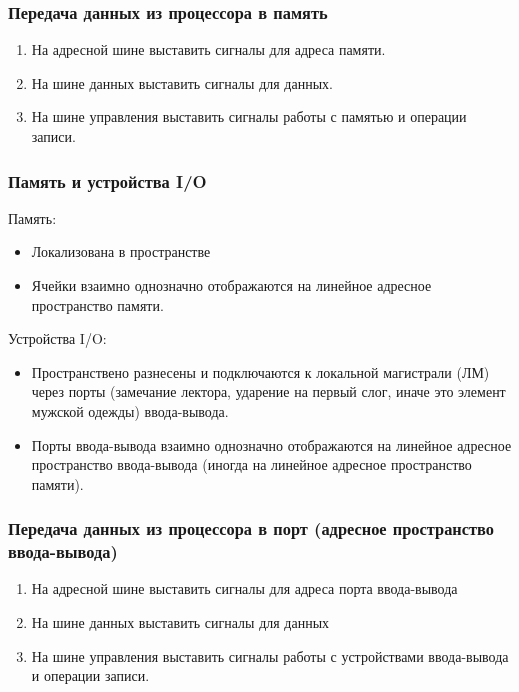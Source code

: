 \documentclass[12pt, a4paper]{article}
\begin{document}
    \subsubsection{Передача данных из процессора в память}
    \begin{enumerate}
        \item На адресной шине выставить сигналы для адреса памяти.
        \item На шине данных выставить сигналы для данных.
        \item На шине управления выставить сигналы работы с памятью и операции записи.
    \end{enumerate} 
    \subsubsection{Память и устройства I/O}
    Память:
    \begin{itemize}
        \item Локализована в пространстве
        \item Ячейки взаимно однозначно отображаются на линейное адресное пространство памяти.
    \end{itemize}
    Устройства I/O:
    \begin{itemize}
        \item Пространствено разнесены и подключаются к локальной магистрали (ЛМ) через порты (замечание лектора, ударение на первый слог, иначе это элемент мужской одежды) ввода-вывода.
        \item Порты ввода-вывода взаимно однозначно отображаются на линейное адресное пространство ввода-вывода (иногда на линейное адресное пространство памяти).
    \end{itemize}
    \subsubsection{Передача данных из процессора в порт (адресное пространство ввода-вывода)}
    \begin{enumerate}
        \item На адресной шине выставить сигналы для адреса порта ввода-вывода
        \item На шине данных выставить сигналы для данных
        \item На шине управления выставить сигналы работы с устройствами ввода-вывода и операции записи.
    \end{enumerate}
\end{document}

